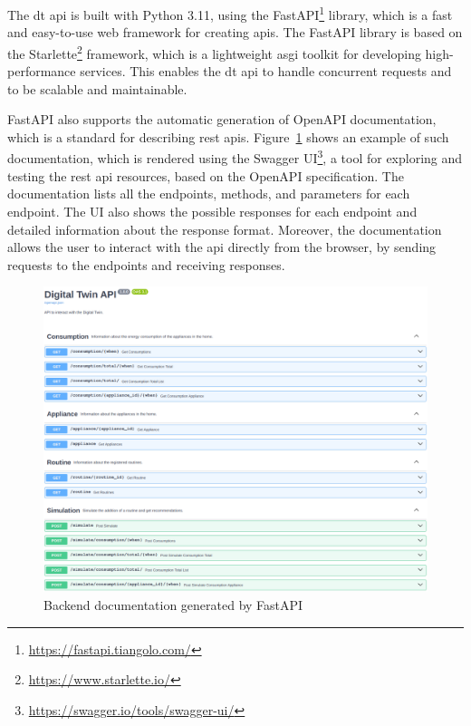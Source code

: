 The \acrshort{dt} \acrshort{api} is built with Python 3.11, using the FastAPI\footnote{\url{https://fastapi.tiangolo.com/}} library, which is a fast and easy-to-use web framework for creating \acrshort{api}s. The FastAPI library is based on the Starlette\footnote{\url{https://www.starlette.io/}} framework, which is a lightweight \acrfull{asgi} toolkit for developing high-performance services. This enables the \acrshort{dt} \acrshort{api} to handle concurrent requests and to be scalable and maintainable.

FastAPI also supports the automatic generation of OpenAPI documentation, which is a standard for describing \acrshort{rest} \acrshort{api}s. Figure~\ref{fig:backend_swagger} shows an example of such documentation, which is rendered using the Swagger UI\footnote{\url{https://swagger.io/tools/swagger-ui/}}, a tool for exploring and testing the \acrshort{rest} \acrshort{api} resources, based on the OpenAPI specification. The documentation lists all the endpoints, methods, and parameters for each endpoint. The UI also shows the possible responses for each endpoint and detailed information about the response format. Moreover, the documentation allows the user to interact with the \acrshort{api} directly from the browser, by sending requests to the endpoints and receiving responses.

\begin{figure}
    \centering
    \includegraphics[width=\textwidth]{images/backend_swagger.png}
    \caption{Backend documentation generated by FastAPI}
    \label{fig:backend_swagger}
\end{figure}

